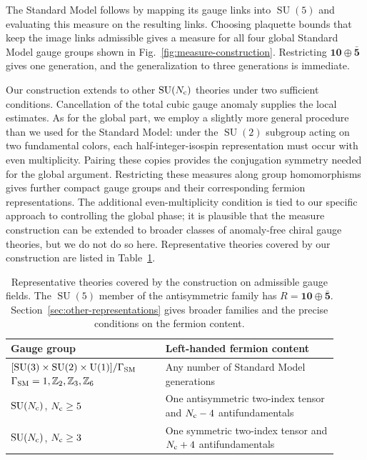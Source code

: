 \documentclass[11pt,a4paper]{article}
\theoremstyle{remark}
\DeclareMathOperator{\SU}{SU}
\begin{document}
The Standard Model follows by mapping its gauge links into $\SU(5)$ and evaluating this measure on the resulting links. Choosing plaquette bounds that keep the image links admissible gives a measure for all four global Standard Model gauge groups shown in Fig.~\ref{fig:measure-construction}. Restricting $\mathbf{10}\oplus\bar{\mathbf5}$ gives one generation, and the generalization to three generations is immediate.

Our construction extends to other $\SU(N_{\rm c})$ theories under two sufficient conditions. Cancellation of the total cubic gauge anomaly supplies the local estimates. As for the global part, we employ a slightly more general procedure than we used for the Standard Model: under the $\SU(2)$ subgroup acting on two fundamental colors, each half-integer-isospin representation must occur with even multiplicity. Pairing these copies provides the conjugation symmetry needed for the global argument. Restricting these measures along group homomorphisms gives further compact gauge groups and their corresponding fermion representations. The additional even-multiplicity condition is tied to our specific approach to controlling the global phase; it is plausible that the measure construction can be extended to broader classes of anomaly-free chiral gauge theories, but we do not do so here. Representative theories covered by our construction are listed in
Table~\ref{tab:intro-covered-theories}.

\begin{table}[htbp]
\centering
\renewcommand{\arraystretch}{1.2}
\begin{tabular}{p{0.43\linewidth}p{0.48\linewidth}}
\hline
Gauge group & Left-handed fermion content \\
\hline
$[\SU(3)\times\SU(2)\times\mathrm{U}(1)]/\Gamma_{\rm SM}$\newline
$\Gamma_{\rm SM}=1,\mathbb Z_2,\mathbb Z_3,\mathbb Z_6$
& Any number of Standard Model generations \\
$\SU(N_{\rm c})$, $N_{\rm c}\ge5$
& One antisymmetric two-index tensor and $N_{\rm c}-4$ antifundamentals \\
$\SU(N_{\rm c})$, $N_{\rm c}\ge3$
& One symmetric two-index tensor and $N_{\rm c}+4$ antifundamentals \\
\hline
\end{tabular}
\caption{Representative theories covered by the construction on admissible
 gauge fields. The $\SU(5)$ member of the antisymmetric family has
 $R=\mathbf{10}\oplus\bar{\mathbf5}$. Section~\ref{sec:other-representations}
 gives broader families and the precise conditions on the fermion content.}
\label{tab:intro-covered-theories}
\end{table}
\end{document}
